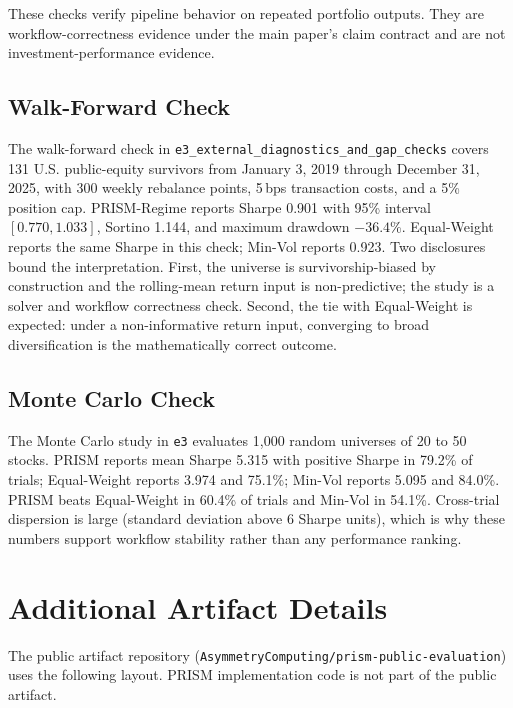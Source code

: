 \documentclass[10pt,a4paper]{extarticle}
\begin{document}
These checks verify pipeline behavior on repeated portfolio outputs. They are
workflow-correctness evidence under the main paper's claim contract and are
not investment-performance evidence.

\subsection{Walk-Forward Check}

The walk-forward check in
\texttt{e3\_external\_diagnostics\_and\_gap\_checks} covers 131 U.S.
public-equity survivors from January 3, 2019 through December 31, 2025, with
300 weekly rebalance points, 5\,bps transaction costs, and a 5\% position cap.
PRISM-Regime reports Sharpe 0.901 with 95\% interval $[0.770, 1.033]$, Sortino
1.144, and maximum drawdown $-36.4\%$. Equal-Weight reports the same Sharpe in
this check; Min-Vol reports 0.923. Two disclosures bound the interpretation.
First, the universe is survivorship-biased by construction and the
rolling-mean return input is non-predictive; the study is a solver and
workflow correctness check. Second, the tie with Equal-Weight is expected:
under a non-informative return input, converging to broad diversification is
the mathematically correct outcome.

\subsection{Monte Carlo Check}

The Monte Carlo study in \texttt{e3} evaluates 1{,}000 random universes of 20
to 50 stocks. PRISM reports mean Sharpe 5.315 with positive Sharpe in 79.2\%
of trials; Equal-Weight reports 3.974 and 75.1\%; Min-Vol reports 5.095 and
84.0\%. PRISM beats Equal-Weight in 60.4\% of trials and Min-Vol in 54.1\%.
Cross-trial dispersion is large (standard deviation above 6 Sharpe units),
which is why these numbers support workflow stability rather than any
performance ranking.

\section{Additional Artifact Details}
\label{app:artifacts}

The public artifact repository
(\texttt{AsymmetryComputing/prism-public-evaluation}) uses the following
layout. PRISM implementation code is not part of the public artifact.
\end{document}
